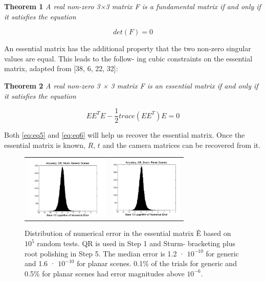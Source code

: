 \documentclass[10pt,twocolumn,letterpaper]{article}
\begin{document}
\textbf{Theorem 1}\textit{ A real non-zero 3×3 matrix F is a fundamental
matrix if and only if it satisfies the equation}

\begin{equation}
    det\left(F\right)=0
    \label{eq:eq5}
\end{equation}

An essential matrix has the additional property that the two
non-zero singular values are equal. This leads to the follow-
ing cubic constraints on the essential matrix, adapted from
[38, 6, 22, 32]:

\textbf{Theorem 2}\textit { A real non-zero 3 × 3 matrix F is an essential
matrix if and only if it satisfies the equation}

\begin{equation}
    EE^TE-\frac{1}{2}trace\left(EE^T\right)E=0
    \label{eq:eq6}
\end{equation}

Both \cref{eq:eq5} and \cref{eq:eq6} will help us recover the essential matrix.
Once the essential matrix is known, $R$, $t$ and the camera
matrices can be recovered from it.


\begin{figure}[H]
    \centering
    \begin{tabular}{cc}
         \includegraphics[width=4cm]{images/im1.png} &  
         \includegraphics[width=3.5cm]{images/im2.png}  
    \end{tabular}
    \caption{ Distribution of numerical error in the essential matrix
Ê based on $10^5$ random tests. QR is used in Step 1 and Sturm-
bracketing plus root polishing in Step 5. The median error is 1.2 ·
$10^{−10}$ for generic and 1.6 · $10^{−10}$ for planar scenes. 0.1\% of the
trials for generic and 0.5\% for planar scenes had error magnitudes
above $10^{-6}$.}
    \label{fig:fig1}
\end{figure}
\end{document}
